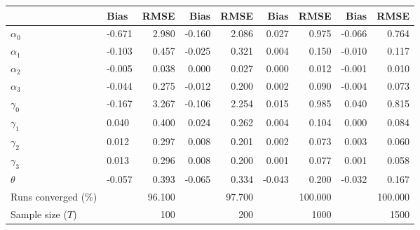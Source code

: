 
\begin{tabular}[t]{llrrrrrrr}
\toprule
  & Bias & RMSE & Bias & RMSE & Bias & RMSE & Bias & RMSE\\
\midrule
$\alpha_{0}$ & -0.671 & 2.980 & -0.160 & 2.086 & 0.027 & 0.975 & -0.066 & 0.764\\
$\alpha_{1}$ & -0.103 & 0.457 & -0.025 & 0.321 & 0.004 & 0.150 & -0.010 & 0.117\\
$\alpha_{2}$ & -0.005 & 0.038 & 0.000 & 0.027 & 0.000 & 0.012 & -0.001 & 0.010\\
$\alpha_{3}$ & -0.044 & 0.275 & -0.012 & 0.200 & 0.002 & 0.090 & -0.004 & 0.073\\
$\gamma_{0}$ & -0.167 & 3.267 & -0.106 & 2.254 & 0.015 & 0.985 & 0.040 & 0.815\\
$\gamma_{1}$ & 0.040 & 0.400 & 0.024 & 0.262 & 0.004 & 0.104 & 0.000 & 0.084\\
$\gamma_{2}$ & 0.012 & 0.297 & 0.008 & 0.201 & 0.002 & 0.073 & 0.003 & 0.060\\
$\gamma_{3}$ & 0.013 & 0.296 & 0.008 & 0.200 & 0.001 & 0.077 & 0.001 & 0.058\\
$\theta$ & -0.057 & 0.393 & -0.065 & 0.334 & -0.043 & 0.200 & -0.032 & 0.167\\
Runs converged (\%) &  & 96.100 &  & 97.700 &  & 100.000 &  & 100.000\\
Sample size ($T$) &  & 100 &  & 200 &  & 1000 &  & 1500\\
\bottomrule
\end{tabular}
